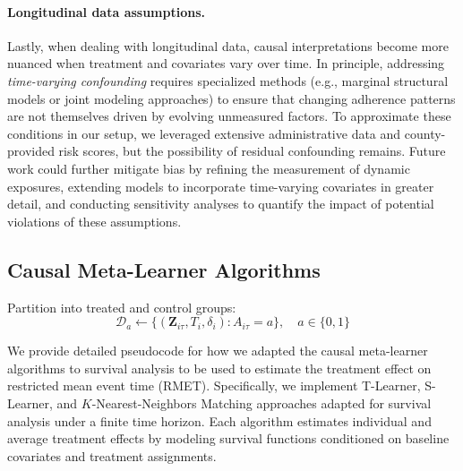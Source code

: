 \paragraph{Longitudinal data assumptions.}
Lastly, when dealing with longitudinal data, causal interpretations become more nuanced when treatment and covariates vary over time.
In principle, addressing \emph{time-varying confounding} requires specialized methods (e.g., marginal structural models or joint modeling approaches) to ensure that changing adherence patterns are not themselves driven by evolving unmeasured factors.
To approximate these conditions in our setup, we leveraged extensive administrative data and county-provided risk scores, but the possibility of residual confounding remains.
Future work could further mitigate bias by refining the measurement of dynamic exposures, extending models to incorporate time-varying covariates in greater detail, and conducting sensitivity analyses to quantify the impact of potential violations of these assumptions.

\subsection{Causal Meta-Learner Algorithms}
\label{apd:causal-meta-learner-algorithms}

\begin{algorithm}[ht]
\caption{T-Learner for Restricted Mean Event Time}
\label{alg:t-learner}

Partition into treated and control groups:\;
\[
\mathcal{D}_a \leftarrow \{(\mathbf{Z}_{i\tau}, T_i, \delta_i) : A_{i\tau} = a\}, \quad a \in \{0,1\}
\]

\Return{
\[
\widehat{\psi}_{\mathrm{T\text{-}learner}} = \frac{1}{N} \sum_{i=1}^N \Bigl(\widehat{\mu}_1(\mathbf{Z}_{i\tau}) - \widehat{\mu}_0(\mathbf{Z}_{i\tau})\Bigr)
\]
}
\end{algorithm}

We provide detailed pseudocode for how we adapted the causal meta-learner algorithms to survival analysis to be used to estimate the treatment effect on restricted mean event time (RMET). 
Specifically, we implement T-Learner, S-Learner, and \(K\)-Nearest-Neighbors Matching approaches adapted for survival analysis under a finite time horizon. 
Each algorithm estimates individual and average treatment effects by modeling survival functions conditioned on baseline covariates and treatment assignments. 

